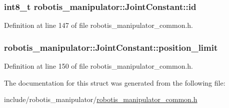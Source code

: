 \subsubsection[{\texorpdfstring{id}{id}}]{\setlength{\rightskip}{0pt plus 5cm}int8\+\_\+t robotis\+\_\+manipulator\+::\+Joint\+Constant\+::id}\hypertarget{structrobotis__manipulator_1_1_joint_constant_ac4e09e4e2886029c58d6f727e9b1e274}{}\label{structrobotis__manipulator_1_1_joint_constant_ac4e09e4e2886029c58d6f727e9b1e274}


Definition at line 147 of file robotis\+\_\+manipulator\+\_\+common.\+h.

\subsubsection[{\texorpdfstring{position\+\_\+limit}{position_limit}}]{ robotis\+\_\+manipulator\+::\+Joint\+Constant\+::position\+\_\+limit}\hypertarget{structrobotis__manipulator_1_1_joint_constant_a15c9d0a10c81d861a1d4762b0f9a790d}{}\label{structrobotis__manipulator_1_1_joint_constant_a15c9d0a10c81d861a1d4762b0f9a790d}


Definition at line 150 of file robotis\+\_\+manipulator\+\_\+common.\+h.



The documentation for this struct was generated from the following file\+:\begin{DoxyCompactItemize}
\item 
include/robotis\+\_\+manipulator/\hyperlink{robotis__manipulator__common_8h}{robotis\+\_\+manipulator\+\_\+common.\+h}\end{DoxyCompactItemize}
